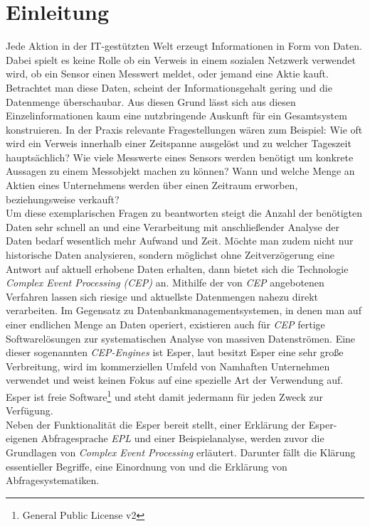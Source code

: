 \documentclass{acm_proc_article-sp}
\begin{document}


\section{Einleitung}
\vspace{0.1cm}
Jede Aktion in der IT-gestützten Welt erzeugt 
Informationen in Form von Daten. Dabei spielt es keine Rolle ob ein Verweis in einem 
sozialen Netzwerk verwendet wird, ob ein Sensor einen Messwert meldet, oder jemand eine 
Aktie kauft. Betrachtet man diese Daten, scheint der Informationsgehalt gering und die 
Datenmenge überschaubar. Aus diesen Grund lässt sich aus diesen Einzelinformationen kaum 
eine nutzbringende Auskunft für ein Gesamtsystem konstruieren. In der Praxis relevante
Fragestellungen wären zum Beispiel: Wie oft wird ein Verweis innerhalb einer Zeitspanne 
ausgelöst und zu welcher Tageszeit hauptsächlich? Wie viele Messwerte eines Sensors 
werden benötigt um konkrete Aussagen zu einem Messobjekt machen zu können? Wann und 
welche Menge an Aktien eines Unternehmens werden über einen Zeitraum erworben, 
beziehungsweise verkauft?\\
Um diese exemplarischen Fragen zu beantworten steigt die Anzahl der benötigten Daten sehr 
schnell an und eine Verarbeitung mit anschließender Analyse der Daten bedarf wesentlich 
mehr Aufwand und Zeit. Möchte man zudem nicht nur historische Daten analysieren, sondern 
möglichst ohne Zeitverzögerung eine Antwort auf aktuell erhobene Daten erhalten, dann 
bietet sich die Technologie \textit{Complex Event Processing (CEP)} an. Mithilfe der von 
\textit{CEP} angebotenen Verfahren lassen sich riesige und aktuellste Datenmengen nahezu 
direkt verarbeiten. Im Gegensatz zu Datenbankmanagementsystemen, in denen man auf einer 
endlichen Menge an Daten operiert, existieren auch für \textit{CEP} fertige 
Softwarelösungen zur systematischen Analyse von massiven Datenströmen. Eine dieser 
sogenannten \textit{CEP-Engines} ist Esper, laut \cite{fraunhofer} besitzt Esper eine 
sehr große Verbreitung, wird im kommerziellen Umfeld von Namhaften Unternehmen 
verwendet und weist keinen Fokus auf eine spezielle Art der Verwendung auf. Esper ist 
freie Software\footnote{General Public License v2} und steht damit jedermann für jeden 
Zweck zur Verfügung.\\
Neben der Funktionalität die Esper bereit stellt, einer Erklärung der Esper-eigenen 
Abfragesprache \textit{EPL} und einer Beispielanalyse, werden zuvor die Grundlagen 
von \textit{Complex Event Processing} erläutert. Darunter fällt die Klärung essentieller 
Begriffe, eine Einordnung von  und die Erklärung von Abfragesystematiken.
\end{document}
